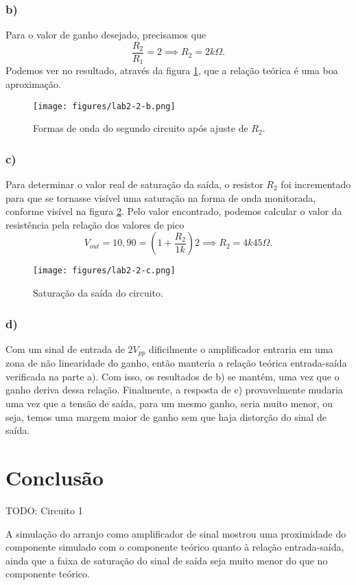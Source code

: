 \documentclass[a4paper]{report}
\begin{document}
\subsubsection*{b)}

Para o valor de ganho desejado, precisamos que \[
\frac{R_2}{R_1} = 2 \implies R_2 = 2k\Omega
.\] Podemos ver no resultado, através da figura \ref{fig:figures-lab2-2-b-png}, que a relação teórica é uma boa aproximação.

\begin{figure}[H]
    \centering
    \texttt{[image: figures/lab2-2-b.png]}
    \caption{Formas de onda do segundo circuito após ajuste de $R_2$.}
    \label{fig:figures-lab2-2-b-png}
\end{figure}

\subsubsection*{c)}

Para determinar o valor real de saturação da saída, o resistor $R_2$ foi incrementado para que se tornasse visível uma saturação na forma de onda monitorada, conforme visível na figura \ref{fig:figures-lab2-2-c-png}. Pelo valor encontrado, podemos calcular o valor da resistência pela relação dos valores de pico \[
    V_{out} = 10,90 = \left( 1 +\frac{R_2}{1k}\right) 2 \implies R_2 = 4k45 \Omega
.\] 

\begin{figure}[H]
    \centering
    \texttt{[image: figures/lab2-2-c.png]}
    \caption{Saturação da saída do circuito.}
    \label{fig:figures-lab2-2-c-png}
\end{figure}

\subsubsection*{d)}

Com um sinal de entrada de $2 V_{pp}$ dificilmente o amplificador entraria em uma zona de não linearidade do ganho, então manteria a relação teórica entrada-saída verificada na parte a). Com isso, os resultados de b) se mantém, uma vez que o ganho deriva dessa relação. Finalmente, a resposta de c) provavelmente mudaria uma vez que a tensão de saída, para um mesmo ganho, seria muito menor, ou seja, temos uma margem maior de ganho sem que haja distorção do sinal de saída.

\section*{Conclusão}

TODO: Circuito 1

A simulação do arranjo como amplificador de sinal mostrou uma proximidade do componente simulado com o componente teórico quanto à relação entrada-saída, ainda que a faixa de saturação do sinal de saída seja muito menor do que no componente teórico.
\end{document}
